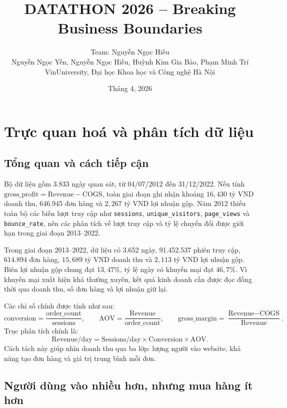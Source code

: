 \documentclass{article}
\title{DATATHON 2026 -- Breaking Business Boundaries\\
\large}
\author{Team: Nguyễn Ngọc Hiếu \\ Nguyễn Ngọc Yến, Nguyễn Ngọc Hiếu, Huỳnh Kim Gia Bảo, Phạm Minh Trí \\ VinUniversity, Đại học Khoa học và Công nghệ Hà Nội}
\date{Tháng 4, 2026}
\begin{document}
\maketitle








\section{Trực quan hoá và phân tích dữ liệu}
\setcounter{page}{1}

\subsection{Tổng quan và cách tiếp cận}

Bộ dữ liệu gồm 3.833 ngày quan sát, từ 04/07/2012 đến 31/12/2022. Nếu tính
$\text{gross\_profit}=\text{Revenue}-\text{COGS}$, toàn giai đoạn ghi nhận khoảng
$16{,}430$ tỷ VND doanh thu, 646.945 đơn hàng và $2{,}267$ tỷ VND lợi nhuận gộp. Năm 2012 thiếu
toàn bộ các biến lượt truy cập như \texttt{sessions}, \texttt{unique\_visitors},
\texttt{page\_views} và \texttt{bounce\_rate}, nên các phân tích về lượt truy cập và tỷ lệ chuyển
đổi được giới hạn trong giai đoạn 2013--2022.

Trong giai đoạn 2013--2022, dữ liệu có 3.652 ngày, 91.452.537 phiên truy cập, 614.894 đơn hàng,
$15{,}689$ tỷ VND doanh thu và $2{,}113$ tỷ VND lợi nhuận gộp. Biên lợi nhuận gộp chung đạt
$13{,}47\%$, tỷ lệ ngày có khuyến mại đạt $46{,}7\%$. Vì khuyến mại xuất hiện khá thường xuyên,
kết quả kinh doanh cần được đọc đồng thời qua doanh thu, số đơn hàng và lợi nhuận giữ lại.

Các chỉ số chính được tính như sau:
\[
\text{conversion}=\frac{\text{order\_count}}{\text{sessions}}, \qquad
\text{AOV}=\frac{\text{Revenue}}{\text{order\_count}}, \qquad
\text{gross\_margin}=\frac{\text{Revenue}-\text{COGS}}{\text{Revenue}}.
\]
Trục phân tích chính là:
\[
\text{Revenue/day}=\text{Sessions/day}\times\text{Conversion}\times\text{AOV}.
\]
Cách tách này giúp nhìn doanh thu qua ba lớp: lượng người vào website, khả năng tạo đơn hàng và giá
trị trung bình mỗi đơn.

\subsection{Người dùng vào nhiều hơn, nhưng mua hàng ít hơn}
\end{document}
